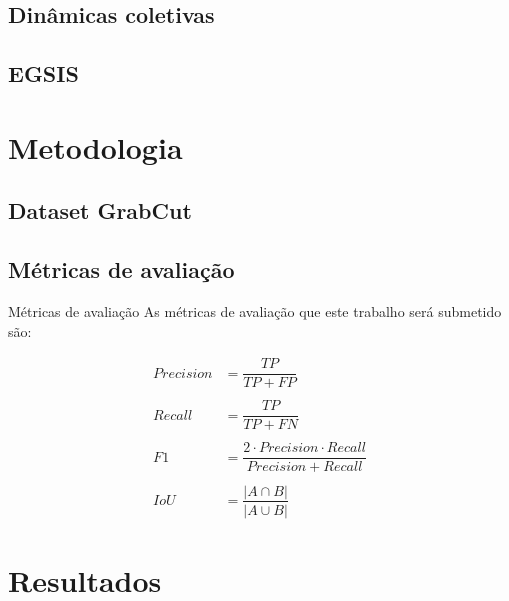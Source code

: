 \documentclass{templatebeamerufc/libs/ufc_format}
\begin{document}
\subsection{Dinâmicas coletivas}
\subsection{EGSIS}

\section{Metodologia}

\subsection{Dataset GrabCut}

\subsection{Métricas de avaliação}
\begin{frame}{Métricas de avaliação}
  As métricas de avaliação que este trabalho será submetido são:


  \begin{equation*}\label{eq:metricas}
    \begin{aligned}
      Precision &= \dfrac{TP}{TP + FP} \\~\\
      Recall &= \dfrac{TP}{TP + FN} \\~\\
      F1 &= \dfrac{2 \cdot Precision \cdot Recall}{Precision + Recall} \\~\\
      IoU &= \dfrac{\left| A \cap B \right|}{\left| A \cup B \right|}
    \end{aligned}
  \end{equation*}

\end{frame}


\section{Resultados}
\end{document}
